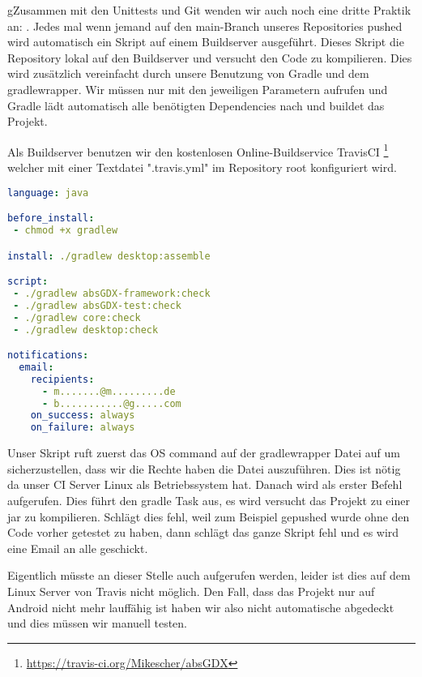 gZusammen mit den Unittests und Git wenden wir auch noch eine dritte Praktik an: .
Jedes mal wenn jemand auf den main-Branch unseres Repositories pushed wird automatisch ein Skript auf einem Buildserver ausgeführt.
Dieses Skript  die Repository lokal auf den Buildserver und versucht den Code zu kompilieren. Dies wird zusätzlich vereinfacht durch unsere Benutzung von Gradle und dem gradlewrapper. Wir müssen nur  mit den jeweiligen Parametern aufrufen und Gradle lädt automatisch alle benötigten Dependencies nach und buildet das Projekt.

Als Buildserver benutzen wir den kostenlosen Online-Buildservice TravisCI \footnote{\url{https://travis-ci.org/Mikescher/absGDX}} welcher mit einer Textdatei ".travis.yml" im Repository root konfiguriert wird.

\begin{lstlisting}[caption=TravisCI Konfiguration, title=\hspace{0 pt}, language=yaml]
language: java

before_install:
 - chmod +x gradlew

install: ./gradlew desktop:assemble

script: 
 - ./gradlew absGDX-framework:check
 - ./gradlew absGDX-test:check
 - ./gradlew core:check
 - ./gradlew desktop:check

notifications:
  email:
    recipients:
      - m.......@m.........de
      - b...........@g.....com
    on_success: always
    on_failure: always
\end{lstlisting}

Unser Skript ruft zuerst das OS command  auf der gradlewrapper Datei auf um sicherzustellen, dass wir die Rechte haben die Datei auszuführen. Dies ist nötig da unser CI Server Linux als Betriebssystem hat.
Danach wird als erster Befehl  aufgerufen. Dies führt den gradle Task  aus, es wird versucht das Projekt zu einer jar zu kompilieren. Schlägt dies fehl, weil zum Beispiel gepushed wurde ohne den Code vorher getestet zu haben, dann schlägt das ganze Skript fehl und es wird eine Email an alle  geschickt.

Eigentlich müsste an dieser Stelle auch  aufgerufen werden, leider ist dies auf dem Linux Server von Travis nicht möglich. Den Fall, dass das Projekt nur auf Android nicht mehr lauffähig ist haben wir also nicht automatische abgedeckt und dies müssen wir manuell testen.

